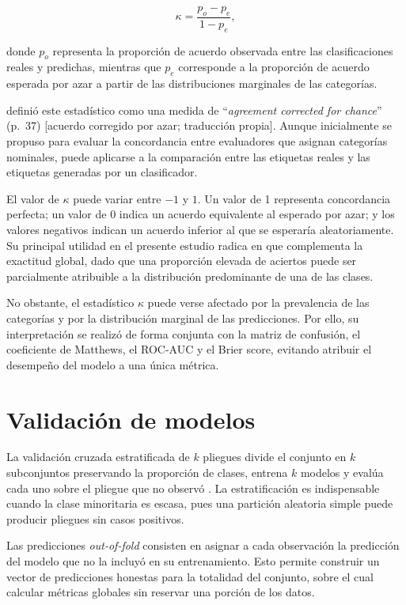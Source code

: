 \begin{equation}
\kappa=\frac{p_o-p_e}{1-p_e},
\end{equation}

donde $p_o$ representa la proporción de acuerdo observada entre las clasificaciones
reales y predichas, mientras que $p_e$ corresponde a la proporción de acuerdo
esperada por azar a partir de las distribuciones marginales de las categorías.

 definió este estadístico como una medida de
``\emph{agreement corrected for chance}'' (p.~37) [acuerdo corregido por azar;
traducción propia]. Aunque inicialmente se propuso para evaluar la concordancia
entre evaluadores que asignan categorías nominales, puede aplicarse a la
comparación entre las etiquetas reales y las etiquetas generadas por un
clasificador.

El valor de $\kappa$ puede variar entre $-1$ y $1$. Un valor de 1 representa
concordancia perfecta; un valor de 0 indica un acuerdo equivalente al esperado por
azar; y los valores negativos indican un acuerdo inferior al que se esperaría
aleatoriamente. Su principal utilidad en el presente estudio radica en que
complementa la exactitud global, dado que una proporción elevada de aciertos puede
ser parcialmente atribuible a la distribución predominante de una de las clases.

No obstante, el estadístico $\kappa$ puede verse afectado por la prevalencia de las
categorías y por la distribución marginal de las predicciones. Por ello, su
interpretación se realizó de forma conjunta con la matriz de confusión, el
coeficiente de Matthews, el ROC-AUC y el Brier score, evitando atribuir el
desempeño del modelo a una única métrica.

\section{Validación de modelos}

La validación cruzada estratificada de $k$ pliegues divide el conjunto en $k$
subconjuntos preservando la proporción de clases, entrena $k$ modelos y evalúa cada
uno sobre el pliegue que no observó \cite{james2021introduction}. La estratificación
es indispensable cuando la clase minoritaria es escasa, pues una partición aleatoria
simple puede producir pliegues sin casos positivos.

Las predicciones \emph{out-of-fold} consisten en asignar a cada observación la
predicción del modelo que no la incluyó en su entrenamiento. Esto permite construir
un vector de predicciones honestas para la totalidad del conjunto, sobre el cual
calcular métricas globales sin reservar una porción de los datos.

